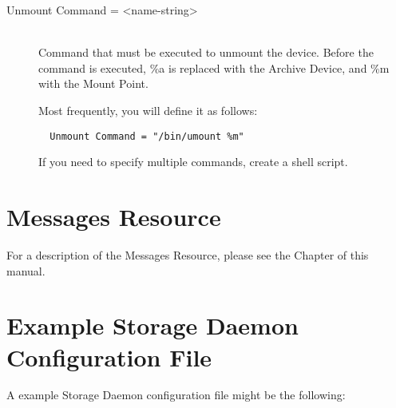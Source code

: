 \begin{description}
\item [Unmount Command = {\textless}name-string{\textgreater}] \hfill \\
Command that must be executed to unmount the device. Before the command  is
executed, \%a is replaced with the Archive Device, and \%m with the  Mount
Point.

Most frequently, you will define it as follows:

\footnotesize
\begin{verbatim}
  Unmount Command = "/bin/umount %m"
\end{verbatim}
\normalsize

  If you need to specify multiple commands, create a shell script.

\end{description}





\section{Messages Resource}
\label{MessagesResource1}

For a description of the Messages Resource, please see the
 Chapter of this
manual.

\section{Example Storage Daemon Configuration File}
\label{ExampleStorageConfiguration}


A example Storage Daemon configuration file might be the following:


